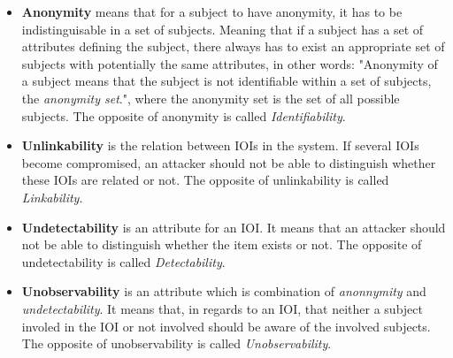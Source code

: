 


\begin{itemize}
\item[] \textbf{Anonymity} means that for a subject to have anonymity, it has to be indistinguisable in a set of subjects. Meaning that if a subject has a set of attributes defining the subject, there always has to exist an appropriate set of subjects with potentially the same attributes, in other words: "Anonymity of a subject means that the subject is not identifiable within a set of subjects, the \textit{anonymity set}.", where the anonymity set is the set of all possible subjects. The opposite of anonymity is called \textit{Identifiability}. 

\item[] \textbf{Unlinkability} is the relation between IOIs in the system. If several IOIs become compromised, an attacker should not be able to distinguish whether these IOIs are related or not. The opposite of unlinkability is called \textit{Linkability}.

\item[] \textbf{Undetectability} is an attribute for an IOI. It means that an attacker should not be able to distinguish whether the item exists or not. The opposite of undetectability is called \textit{Detectability}.

\item[] \textbf{Unobservability} is an attribute which is combination of \textit{anonnymity} and \textit{undetectability}. It means that, in regards to an IOI, that neither a subject involed in the IOI or not involved should be aware of the involved subjects. The opposite of unobservability is called \textit{Unobservability}.
\end{itemize}



